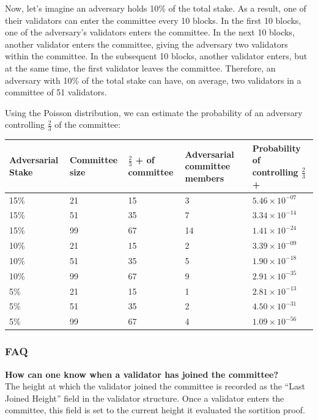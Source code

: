 \documentclass{novel}
\begin{document}
Now, let’s imagine an adversary holds 10\% of the total stake. As a result, one of their validators can enter the committee every 10 blocks. In the first 10 blocks, one of the adversary’s validators enters the committee. In the next 10 blocks, another validator enters the committee, giving the adversary two validators within the committee. In the subsequent 10 blocks, another validator enters, but at the same time, the first validator leaves the committee. Therefore, an adversary with 10\% of the total stake can have, on average, two validators in a committee of 51 validators.

Using the Poisson distribution, we can estimate the probability of an adversary controlling $\frac{2}{3}$ of the committee:

\begin{tabular}{|p{2.1cm}|p{1.7cm}|p{2.5cm}|p{2cm}|p{2.5cm}|  }
 \hline
 \textbf{Adversarial Stake} & \textbf{Committee size} & \textbf{$\frac{2}{3}$ + of committee} & \textbf{Adversarial committee members} & \textbf{Probability of controlling $\frac{2}{3}$+} \\
 \hline
 15\% & 21 & 15 & 3 & $5.46 \times 10^{-07}$ \\
 \hline
 15\% & 51 & 35 & 7 & $3.34 \times 10^{-14}$ \\
 \hline
 15\% & 99 & 67 & 14 & $1.41 \times 10^{-24}$ \\
 \hline
 10\% & 21 & 15 & 2 & $3.39 \times 10^{-09}$ \\
 \hline
 10\% & 51 & 35 & 5 & $1.90 \times 10^{-18}$ \\
 \hline
 10\% & 99 & 67 & 9 & $2.91 \times 10^{-35}$ \\
 \hline
 5\% & 21 & 15 & 1 & $2.81 \times 10^{-13}$ \\
 \hline
 5\% & 51 & 35 & 2 & $4.50 \times 10^{-31}$ \\
 \hline
 5\% & 99 & 67 & 4 & $1.09 \times 10^{-56}$ \\
 \hline
\end{tabular}

\subsubsection{FAQ}
\noindent \textbf{How can one know when a validator has joined the committee?}\\
The height at which the validator joined the committee is recorded as the “Last Joined Height” field in the validator structure. Once a validator enters the committee, this field is set to the current height it evaluated the sortition proof.
\end{document}

